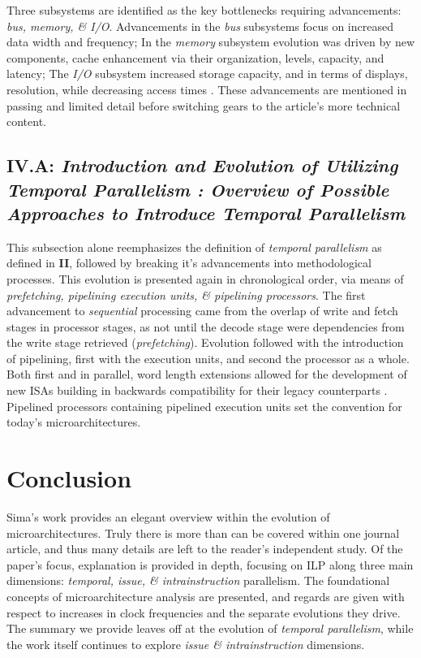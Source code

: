 \documentclass{article}
\begin{document}
Three subsystems are identified as the key bottlenecks requiring advancements: \emph{bus, memory, \& I/O}.
Advancements in the \emph{bus} subsystems focus on increased data width and frequency; In the \emph{memory} subsystem evolution was driven by new components, cache enhancement via their organization, levels, capacity, and latency; The \emph{I/O} subsystem increased storage capacity, and in terms of displays, resolution, while decreasing access times \cite{Sima}.
These advancements are mentioned in passing and limited detail before switching gears to the article's more technical content.

\subsection{\textbf{IV.A}: \emph{Introduction and Evolution of Utilizing Temporal Parallelism : Overview of Possible Approaches to Introduce Temporal Parallelism}}
This subsection alone reemphasizes the definition of \emph{temporal parallelism} as defined in \textbf{II}, followed by breaking it's advancements into methodological processes.
This evolution is presented again in chronological order, via means of \emph{prefetching, pipelining execution units, \& pipelining processors}.
The first advancement to \emph{sequential} processing came from the overlap of write and fetch stages in processor stages, as not until the decode stage were dependencies from the write stage retrieved (\emph{prefetching}).
Evolution followed with the introduction of pipelining, first with the execution units, and second the processor as a whole.
Both first and in parallel, word length extensions allowed for the development of new ISAs building in backwards compatibility for their legacy counterparts \cite{Sima}.
Pipelined processors containing pipelined execution units set the convention for today's microarchitectures.

\section{Conclusion}
Sima's work provides an elegant overview within the evolution of microarchitectures.
Truly there is more than can be covered within one journal article, and thus many details are left to the reader's independent study.
Of the paper's focus, explanation is provided in depth, focusing on ILP along three main dimensions: \emph{temporal, issue, \& intrainstruction} parallelism.
The foundational concepts of microarchitecture analysis are presented, and regards are given with respect to increases in clock frequencies and the separate evolutions they drive.
The summary we provide leaves off at the evolution of \emph{temporal parallelism}, while the work itself continues to explore \emph{issue \& intrainstruction} dimensions.

\newpage

{}
\end{document}
